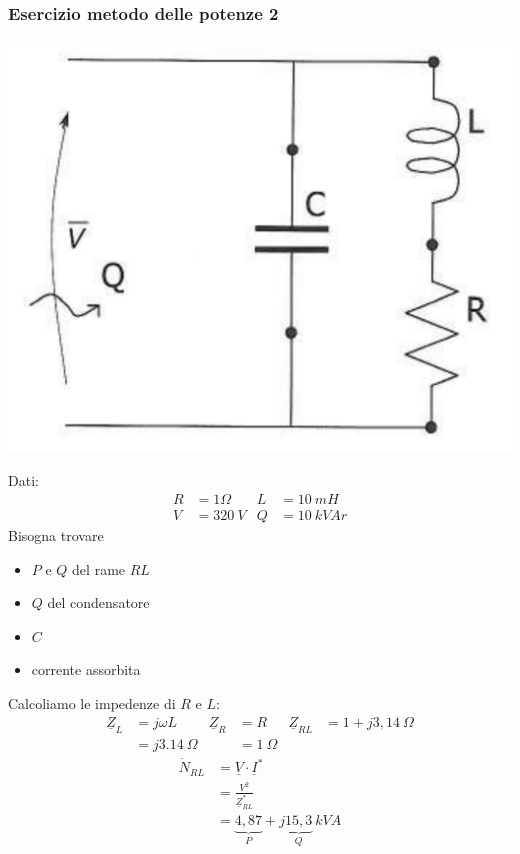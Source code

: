 \documentclass{article}
\begin{document}
\subsubsection{Esercizio metodo delle potenze 2}
\begin{center}
    \includegraphics[scale=0.27]{Image/Esercizio_potenze_2.png}
\end{center}
Dati:
\begin{align*}
    R &= 1 \Omega & L &= 10\ mH \\
    V &= 320 \ V & Q &= 10 \ kVAr
\end{align*}
Bisogna trovare
\begin{itemize}
    \item $P$ e $Q$ del rame $RL$
    \item $Q$ del condensatore
    \item $C$
    \item corrente assorbita
\end{itemize}
Calcoliamo le impedenze di $R$ e $L$:
\begin{align*}
    \underline{Z}_L &= j \omega L & 
    \underline{Z}_R &= R &
    \underline{Z}_{RL} &= 1 + j 3,14 \ \Omega
    \\
    &= j3.14 \  \Omega &
    &= 1 \ \Omega
\end{align*}
\begin{align*}
    \dot N_{RL} &= \underline{V} \cdot \underline{I}^*
    \\
    &= \frac{V^2}{\underline{Z}_{RL}^*}
    \\
    &= \underbrace{4,87}_{P} + j\underbrace{15,3}_{Q} \ kVA
\end{align*}
\end{document}
